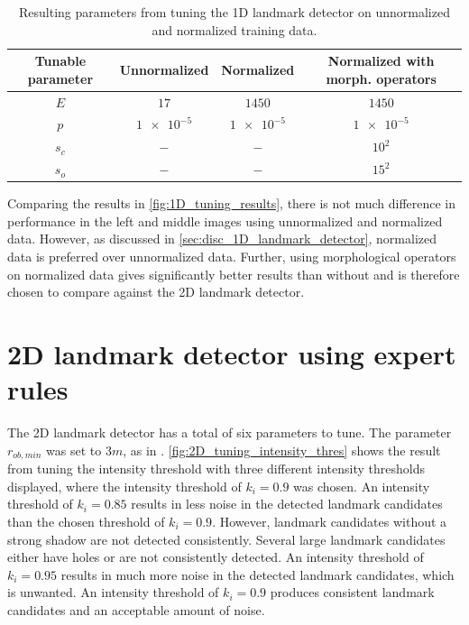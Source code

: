 \begin{table} [h]
    \caption{Resulting parameters from tuning the 1D landmark detector on unnormalized and normalized training data.}
    \centering
    \begin{tabular}{cccc}
        \hline
        \textbf{Tunable parameter} & \textbf{Unnormalized} & \textbf{Normalized} & \textbf{Normalized with morph. operators} \\ \hline
        $E$                        & $17$                  & $1450$              & $1450$                                    \\
        $p$                        & $\num{1e-5}$          & $\num{1e-5}$        & $\num{1e-5}$                              \\
        $s_c$                      & $-$                   & $-$                 & $10^2$                                    \\
        $s_o$                      & $-$                   & $-$                 & $15^2$                                    \\ \hline
    \end{tabular}
    \label{tab:1D_parameters}
\end{table}

\newpage
 
Comparing the results in \cref{fig:1D_tuning_results}, there is not much difference in performance in the left and middle images using unnormalized and normalized data. However, as discussed in \cref{sec:disc_1D_landmark_detector}, normalized data is preferred over unnormalized data. Further, using morphological operators on normalized data gives significantly better results than without and is therefore chosen to compare against the 2D landmark detector.

\section{2D landmark detector using expert rules}

The 2D landmark detector has a total of six parameters to tune. The parameter $r_{ob, min}$ was set to $3 m $, as in \cite{Leblond2019SonarProject}. \cref{fig:2D_tuning_intensity_thres} shows the result from tuning the intensity threshold with three different intensity thresholds displayed, where the intensity threshold of $k_i = 0.9$ was chosen. An intensity threshold of $k_i = 0.85$ results in less noise in the detected landmark candidates than the chosen threshold of $k_i = 0.9$. However, landmark candidates without a strong shadow are not detected consistently. Several large landmark candidates either have holes or are not consistently detected. An intensity threshold of $k_i = 0.95$ results in much more noise in the detected landmark candidates, which is unwanted. An intensity threshold of $k_i = 0.9$ produces consistent landmark candidates and an acceptable amount of noise. 

